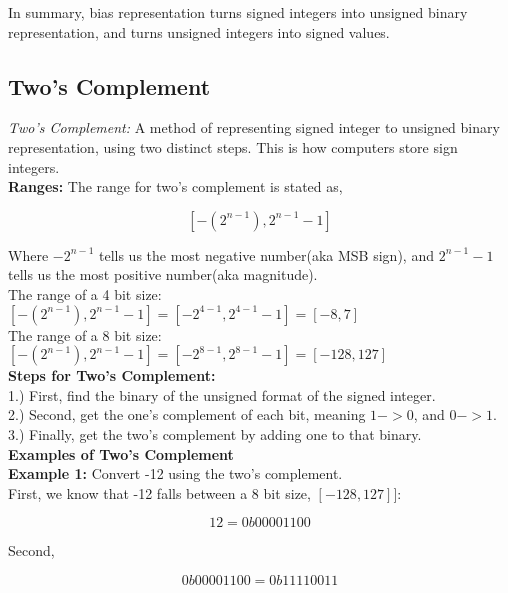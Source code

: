 \documentclass{article}
\begin{document}
\noindent In summary, bias representation turns signed integers into unsigned binary representation, and turns unsigned 
integers into signed values.

\subsection*{Two's Complement} 
\textit{Two's Complement:} A method of representing signed integer to unsigned binary representation, using two
distinct steps. This is how computers store sign integers. \\

\noindent \textbf{Ranges:} The range for two's complement is stated as,

\[
[-(2^{n-1}), 2^{n-1} - 1]
\]

\noindent Where $-2^{n-1}$ tells us the most negative number(aka MSB sign), and $2^{n-1} - 1$ tells us the most
positive number(aka magnitude). \\

\noindent The range of a 4 bit size: $[-(2^{n-1}), 2^{n-1} - 1] = [-2^{4-1}, 2^{4-1} - 1] = [-8, 7]$ \\

\noindent The range of a 8 bit size: $[-(2^{n-1}), 2^{n-1} - 1] = [-2^{8-1}, 2^{8-1} - 1] = [-128, 127]$ \\

\noindent \textbf{Steps for Two's Complement:} \\

1.) First, find the binary of the unsigned format of the signed integer. \\

2.) Second, get the one's complement of each bit, meaning $1 -> 0$, and $0 -> 1$. \\

3.) Finally, get the two's complement by adding one to that binary. \\

\noindent \textbf{Examples of Two's Complement} \\

\noindent \textbf{Example 1:} Convert -12 using the two's complement. \\

First, we know that -12 falls between a 8 bit size, $[-128, 127]]$:

\[
12 = 0b0000 1100
\] 

Second,

\[
0b0000 1100 = 0b1111 0011
\]
\end{document}
